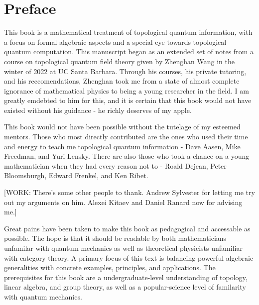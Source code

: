 \section{Preface}
\label{Preface}

This book is a mathematical treatment of topological quantum information, with a focus on formal algebraic aspects and a special eye towards topological quantum computation. This manuscript began as an extended set of notes from a course on topological quantum field theory given by Zhenghan Wang in the winter of 2022 at UC Santa Barbara. Through his courses, his private tutoring, and his reccomendations, Zhenghan took me from a state of almost complete ignorance of mathematical physics to being a young researcher in the field. I am greatly emdebted to him for this, and it is certain that this book would not have existed without his guidance - he richly deserves of my apple.

This book would not have been possible without the tutelage of my esteemed mentors. Those who most directly contributed are the ones who used their time and energy to teach me topological quantum information - Dave Aasen, Mike Freedman, and Yuri Lensky. There are also those who took a chance on a young mathematician when they had every reason not to - Roald Dejean, Peter Bloomsburgh, Edward Frenkel, and Ken Ribet.

[WORK: There's some other people to thank. Andrew Sylvester for letting me try out my arguments on him. Alexei Kitaev and Daniel Ranard now for advising me.]

Great pains have been taken to make this book as pedagogical and accessable as possible. The hope is that it should be readable by both mathematicians unfamilar with quantum mechanics as well as theoretical physicists unfamiliar with category theory. A primary focus of this text is balancing powerful algebraic generalities with concrete examples, principles, and applications. The prerequisites for this book are a undergraduate-level understanding of topology, linear algebra, and group theory, as well as a popular-science level of familarity with quantum mechanics.

